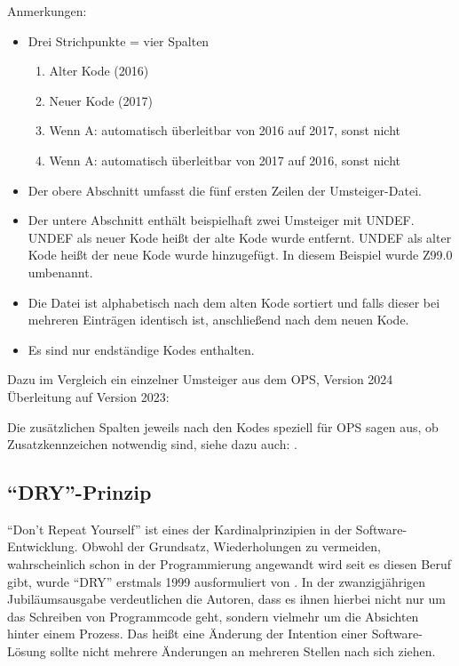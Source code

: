 Anmerkungen: 
\begin{itemize}
\item Drei Strichpunkte = vier Spalten
\begin{enumerate}
\item Alter Kode (2016)
\item Neuer Kode (2017)
\item Wenn A: automatisch überleitbar von 2016 auf 2017, sonst nicht
\item Wenn A: automatisch überleitbar von 2017 auf 2016, sonst nicht
\end{enumerate}
\item Der obere Abschnitt umfasst die fünf ersten Zeilen der Umsteiger-Datei. 
\item Der untere Abschnitt enthält beispielhaft zwei Umsteiger mit UNDEF. UNDEF als neuer Kode heißt der alte Kode wurde entfernt. UNDEF als alter Kode heißt der neue Kode wurde hinzugefügt. In diesem Beispiel wurde Z99.0 umbenannt. 
\item Die Datei ist alphabetisch nach dem alten Kode sortiert und falls dieser bei mehreren Einträgen identisch ist, anschließend nach dem neuen Kode.
\item Es sind nur endständige Kodes enthalten. 
\end{itemize}

Dazu im Vergleich ein einzelner Umsteiger aus dem OPS, Version 2024 Überleitung auf Version 2023:


Die zusätzlichen Spalten jeweils nach den Kodes speziell für OPS sagen aus, ob Zusatzkennzeichen notwendig sind, siehe dazu auch: \citep[Kategorie und Kode im OPS]{bfarmopskk}.

\subsection{``DRY''-Prinzip}

``Don't Repeat Yourself'' ist eines der Kardinalprinzipien in der Software-Entwicklung. Obwohl der Grundsatz, Wiederholungen zu vermeiden, wahrscheinlich schon in der Programmierung angewandt wird seit es diesen Beruf gibt, wurde ``DRY'' erstmals 1999 ausformuliert von \citep[Seite 79ff]{thomas2019pragmatic}. In der zwanzigjährigen Jubiläumsausgabe verdeutlichen die Autoren, dass es ihnen hierbei nicht nur um das Schreiben von Programmcode geht, sondern vielmehr um die Absichten hinter einem Prozess. Das heißt eine Änderung der Intention einer Software-Lösung sollte nicht mehrere Änderungen an mehreren Stellen nach sich ziehen. 

